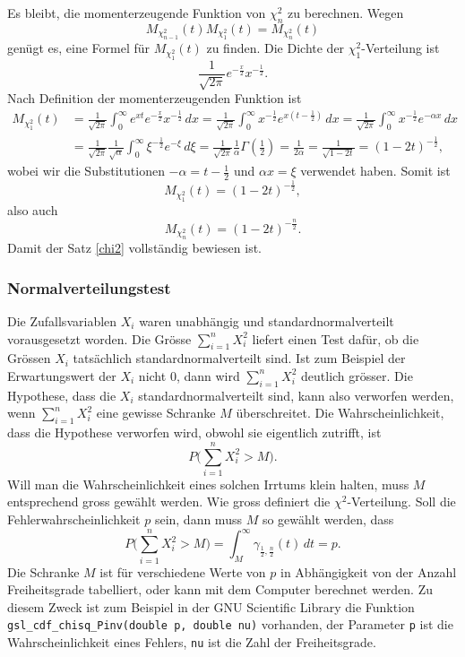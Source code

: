 {Es bleibt, die momenterzeugende Funktion von $\chi_n^2$ zu berechnen.
Wegen
\[
M_{\chi_{n-1}^2}(t)M_{\chi_1^2}(t)=M_{\chi_n^2}(t)
\]
genügt es, eine Formel für $M_{\chi_1^2}(t)$ zu finden.
Die Dichte
der $\chi_1^2$-Verteilung ist
\[
\frac1{\sqrt{2\pi}}e^{-\frac{x}2}x^{-\frac12}.
\]
Nach Definition der momenterzeugenden Funktion ist
\begin{align*}
M_{\chi_1^2}(t)
&=\frac1{\sqrt{2\pi}}\int_0^\infty e^{xt}e^{-\frac{x}2}x^{-\frac12}\,dx
=\frac1{\sqrt{2\pi}}\int_0^\infty x^{-\frac12}e^{x(t-\frac12)}\,dx
=\frac1{\sqrt{2\pi}}\int_0^\infty x^{-\frac12}e^{-\alpha x}\,dx\\
&=\frac1{\sqrt{2\pi}}\frac1{\sqrt{\alpha}}\int_0^\infty\xi^{-\frac12}e^{-\xi}\,d\xi
=\frac1{\sqrt{2\pi}}\frac1{\alpha}\Gamma(\frac12)=\frac1{2\alpha}
=\frac1{\sqrt{1-2t}}=(1-2t)^{-\frac12},
\end{align*}
wobei wir die Substitutionen $-\alpha=t-\frac12$ und $\alpha x=\xi$
verwendet haben.
Somit ist
\[
M_{\chi_1^2}(t)=(1-2t)^{-\frac12},
\]
also auch
\[
M_{\chi_n^2}(t)=(1-2t)^{-\frac{n}2}.
\]
Damit der Satz \ref{chi2} vollständig bewiesen ist.

\subsubsection{Normalverteilungstest}
Die Zufallsvariablen $X_i$ waren unabhängig und standardnormalverteilt
vorausgesetzt worden.
Die Grösse $\sum_{i=1}^nX_i^2$ liefert einen Test dafür, ob die Grössen
$X_i$ tatsächlich standardnormalverteilt sind.
Ist zum Beispiel der
Erwartungswert der $X_i$ nicht $0$, dann wird $\sum_{i=1}^nX_i^2$
deutlich grösser.
Die Hypothese, dass die $X_i$ standardnormalverteilt
sind, kann also verworfen werden, wenn $\sum_{i=1}^nX_i^2$ eine gewisse
Schranke $M$ überschreitet.
Die Wahrscheinlichkeit, dass die Hypothese
verworfen wird, obwohl sie eigentlich zutrifft, ist
\[
P\biggl(\sum_{i=1}^nX_i^2>M\biggr).
\]
Will man die Wahrscheinlichkeit eines solchen Irrtums klein halten, muss
$M$ entsprechend gross gewählt werden.
Wie gross definiert die
$\chi^2$-Verteilung.
Soll die Fehlerwahrscheinlichkeit $p$ sein,
dann muss $M$ so gewählt werden, dass 
\[
P\biggl(\sum_{i=1}^nX_i^2>M\biggr)
=
\int_M^\infty \gamma_{\frac12,\frac{n}2}(t)\,dt = p.
\]
Die Schranke $M$ ist für verschiedene Werte von $p$ in Abhängigkeit
von der Anzahl Freiheitsgrade tabelliert, oder kann mit dem Computer
berechnet werden.
Zu diesem Zweck ist zum Beispiel in der GNU Scientific
Library die Funktion \verb+gsl_cdf_chisq_Pinv(double p, double nu)+
vorhanden, der Parameter \verb+p+ ist die Wahrscheinlichkeit eines
Fehlers, {\tt nu} ist die Zahl der Freiheitsgrade.
}

